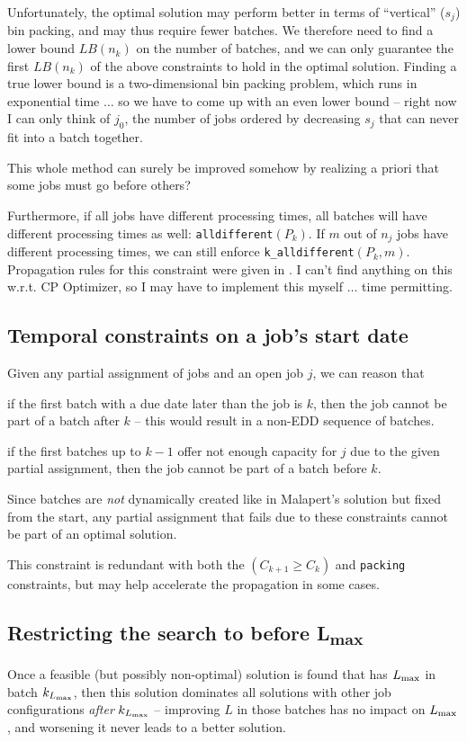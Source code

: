 Unfortunately, the optimal solution may perform better in terms of ``vertical''
($s_j$) bin packing, and may thus
require fewer batches. We therefore need to find a lower bound $LB(n_k)$ on the
number of batches, and we can only guarantee the first $LB(n_k)$ of the above
constraints to hold in the optimal solution. Finding a true lower bound is a
two-dimensional bin packing problem, which runs in exponential time
{\color{darkred} $\dots$ so we have to come up with an even lower bound -- right
now I can only think of $j_0$, the number of jobs ordered by decreasing $s_j$
that can never fit into a batch together.}

{\color{darkred} This whole method can surely be
improved somehow by realizing a priori that some jobs must go before others?}

Furthermore, if all jobs have different processing times, all batches will have
different processing times as well: \texttt{alldifferent}$(P_k)$. If $m$ out of $n_j$ jobs have different
processing times, we can still enforce \texttt{k\_alldifferent}$(P_k, m)$.
Propagation rules for this constraint were given in \cite{Lardeux}.
{\color{darkred} I can't find anything on this w.r.t. CP Optimizer, so I may
have to implement this myself $\dots$ time permitting.} 

\subsection{Temporal constraints on a job's start date}
Given any partial assignment of jobs and an open job $j$, we can reason that
\begin{alist}
\item{if the first batch with a due date later than the job is $k$, then the job
cannot be part of a batch after $k$ -- this would result in a non-EDD sequence
of batches.}
\item{if the first batches up to $k-1$ offer not enough capacity for $j$ due to
the given partial assignment, then the job cannot be part of a batch before
$k$.}
\end{alist}
Since batches are \textit{not} dynamically created like in Malapert's solution
but fixed from the start, any partial assignment that fails due to these
constraints cannot be part of an optimal solution.

This constraint is redundant with both the $(C_{k+1}\geq C_k)$ and
\texttt{packing} constraints, but may help accelerate the propagation in some
cases.

\subsection{Restricting the search to {\sansitalicfont before
L}\textsubscript{max}}
Once a feasible (but possibly non-optimal) solution is found that has $L_{\text{max}}$ in
batch $k_{L_{\text{max}}}$, then this solution dominates all solutions with other job
configurations 
\textit{after} $k_{L_{\text{max}}}$ -- improving $L$ in those batches has no impact on $L_{\text{max}}$,
and worsening it never leads to a better solution.

